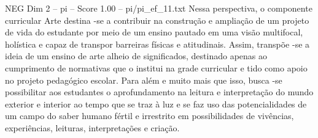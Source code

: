 \begin{textsample}{NEG Dim 2 – pi – Score 1.00 – pi/pi\_ef\_11.txt}
Nessa perspectiva, o componente curricular Arte destina -se a contribuir na construção e ampliação de um projeto de vida do estudante por meio de um ensino pautado em uma visão multifocal, holística e capaz de transpor barreiras físicas e atitudinais.
Assim, transpõe -se a ideia de um ensino de arte alheio de significados, destinado apenas ao cumprimento de normativas que o institui na grade curricular e tido como apoio no projeto pedagógico escolar.
Para além e muito mais que isso, busca -se possibilitar aos estudantes o aprofundamento na leitura e interpretação do mundo exterior e interior ao tempo que se traz à luz e se faz uso das potencialidades de um campo do saber humano fértil e irrestrito em possibilidades de vivências, experiências, leituras, interpretações e criação.

\end{textsample}
